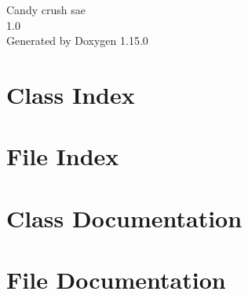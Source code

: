 \documentclass[twoside]{book}
\newcommand{\+}{\discretionary{\mbox{\scriptsize$\hookleftarrow$}}{}{}}
\newcommand{\clearemptydoublepage}{%
    \newpage{\pagestyle{empty}\cleardoublepage}%
  }
\begin{document}
  \raggedbottom
    \hypersetup{pageanchor=false,
                bookmarksnumbered=true,
                pdfencoding=unicode
               }
  \begin{titlepage}
  \vspace*{7cm}
  \begin{center}%
  {\Large Candy crush sae}\\
  [1ex]\large 1.\+0 \\
  \vspace*{1cm}
  {\large Generated by Doxygen 1.15.0}\\
  \end{center}
  \end{titlepage}
  \clearemptydoublepage
  \tableofcontents
  \clearemptydoublepage
  \hypersetup{pageanchor=true}
\chapter{Class Index}

\chapter{File Index}

\chapter{Class Documentation}


\chapter{File Documentation}




  \backmatter
  \newpage
  \clearemptydoublepage
  \printindex
\end{document}

